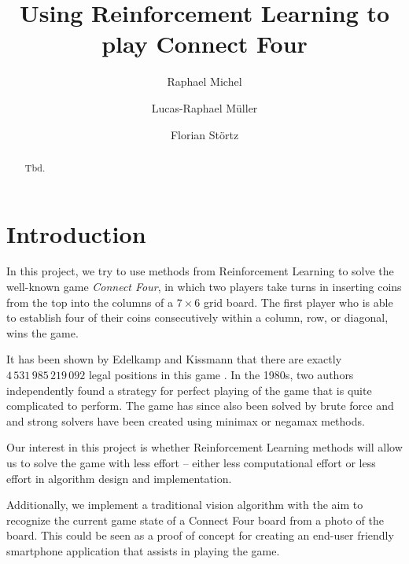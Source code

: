 \documentclass[10pt,twocolumn,letterpaper]{article}
\begin{document}
\title{Using Reinforcement Learning to play Connect Four}

\author{Raphael Michel
\and
Lucas-Raphael Müller
\and
Florian Störtz
}

\maketitle

\begin{abstract}
   Tbd.
\end{abstract}

\section{Introduction}

In this project, we try to use methods from Reinforcement Learning to solve
the well-known game \emph{Connect Four}, in which two players take turns in
inserting coins from the top into the columns of a $7\times 6$ grid board.
The first player who is able to establish four of their coins consecutively
within a column, row, or diagonal, wins the game.

It has been shown by Edelkamp and Kissmann that there are exactly $4\,531\,985\,219\,092$ legal positions in this game \cite{Edelkamp2008}. In the 1980s, two authors independently found a strategy for perfect playing of the game \cite{Allis88}\cite{Allen1990} that is quite complicated to perform. The game has since also been solved by brute force and and strong solvers have been created using minimax or negamax methods.

Our interest in this project is whether Reinforcement Learning methods will allow us to solve the game with less effort -- either less computational effort or less effort in algorithm design and implementation.

Additionally, we implement a traditional vision algorithm with the aim to
recognize the current game state of a Connect Four board from a photo of the
board. This could be seen as a proof of concept for creating an end-user friendly smartphone application that assists in playing the game.
\end{document}
